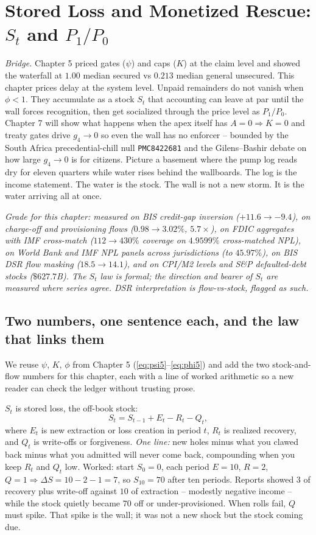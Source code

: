 \chapter{Stored Loss and Monetized Rescue: $S_t$ and $P_1/P_0$}
\label{ch:storedloss}

\textit{Bridge.} Chapter 5 priced gates ($\psi$) and caps ($K$) at the claim level and showed the waterfall at $1.00$ median secured vs $0.213$ median general unsecured. This chapter prices delay at the system level. Unpaid remainders do not vanish when $\phi<1$. They accumulate as a stock $S_t$ that accounting can leave at par until the wall forces recognition, then get socialized through the price level as $P_1/P_0$. Chapter 7 will show what happens when the apex itself has $A=0\Rightarrow K=0$ and treaty gates drive $g_4\to0$ so even the wall has no enforcer -- bounded by the South Africa precedential-chill null \texttt{PMC8422681} and the Gilens--Bashir debate on how large $g_4\to0$ is for citizens. Picture a basement where the pump log reads dry for eleven quarters while water rises behind the wallboards. The log is the income statement. The water is the stock. The wall is not a new storm. It is the water arriving all at once.

\textit{Grade for this chapter: measured on BIS credit-gap inversion ($+11.6\to-9.4$), on charge-off and provisioning flows ($0.98\to3.02\%$, $5.7\times$), on FDIC aggregates with IMF cross-match ($112\to430\%$ coverage on $4.9599\%$ cross-matched NPL), on World Bank and IMF NPL panels across jurisdictions (to $45.97\%$), on BIS DSR flow masking ($18.5\to14.1$), and on CPI/M2 levels and S\&P defaulted-debt stocks ($\$627.7$B). The $S_t$ law is formal; the direction and bearer of $S_t$ are measured where series agree. DSR interpretation is flow-vs-stock, flagged as such.}

\section{Two numbers, one sentence each, and the law that links them}
\label{sec:stored-defs}

We reuse $\psi$, $K$, $\phi$ from Chapter 5 (\ref{eq:psi5}--\ref{eq:phi5}) and add the two stock-and-flow numbers for this chapter, each with a line of worked arithmetic so a new reader can check the ledger without trusting prose.

$S_t$ is stored loss, the off-book stock:
\begin{equation}
S_t = S_{t-1}+E_t-R_t-Q_t,
\label{eq:St6}
\end{equation}
where $E_t$ is new extraction or loss creation in period $t$, $R_t$ is realized recovery, and $Q_t$ is write-offs or forgiveness. \textit{One line:} new holes minus what you clawed back minus what you admitted will never come back, compounding when you keep $R_t$ and $Q_t$ low. Worked: start $S_0=0$, each period $E=10$, $R=2$, $Q=1\Rightarrow\Delta S=10-2-1=7$, so $S_{10}=70$ after ten periods. Reports showed $3$ of recovery plus write-off against $10$ of extraction -- modestly negative income -- while the stock quietly became $70$ off or under-provisioned. When rolls fail, $Q$ must spike. That spike is the wall; it was not a new shock but the stock coming due.

